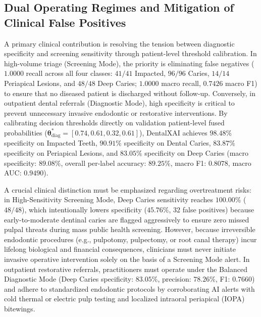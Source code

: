 \documentclass[review]{elsarticle}
\begin{document}
\subsection{Dual Operating Regimes and Mitigation of Clinical False Positives}
A primary clinical contribution is resolving the tension between diagnostic specificity and screening sensitivity through patient-level threshold calibration. In high-volume triage (Screening Mode), the priority is eliminating false negatives ($1.0000$ recall across all four classes: $41/41$ Impacted, $96/96$ Caries, $14/14$ Periapical Lesions, and $48/48$ Deep Caries; $1.0000$ macro recall, $0.7426$ macro F1) to ensure that no diseased patient is discharged without follow-up. Conversely, in outpatient dental referrals (Diagnostic Mode), high specificity is critical to prevent unnecessary invasive endodontic or restorative interventions. By calibrating decision thresholds directly on validation patient-level fused probabilities ($\boldsymbol{\theta}^*_{\text{diag}} = [0.74, 0.61, 0.32, 0.61]$), DentalXAI achieves $98.48\%$ specificity on Impacted Teeth, $90.91\%$ specificity on Dental Caries, $83.87\%$ specificity on Periapical Lesions, and $83.05\%$ specificity on Deep Caries (macro specificity: $89.08\%$, overall per-label accuracy: $89.25\%$, macro F1: $0.8078$, macro AUC: $0.9490$).

A crucial clinical distinction must be emphasized regarding overtreatment risks: in High-Sensitivity Screening Mode, Deep Caries sensitivity reaches $100.00\%$ ($48/48$), which intentionally lowers specificity ($45.76\%$, $32$ false positives) because early-to-moderate dentinal caries are flagged aggressively to ensure zero missed pulpal threats during mass public health screening. However, because irreversible endodontic procedures (e.g., pulpotomy, pulpectomy, or root canal therapy) incur lifelong biological and financial consequences, clinicians must never initiate invasive operative intervention solely on the basis of a Screening Mode alert. In outpatient restorative referrals, practitioners must operate under the Balanced Diagnostic Mode (Deep Caries specificity: $83.05\%$, precision: $78.26\%$, F1: $0.7660$) and adhere to standardized endodontic protocols by corroborating AI alerts with cold thermal or electric pulp testing and localized intraoral periapical (IOPA) bitewings.
\end{document}
